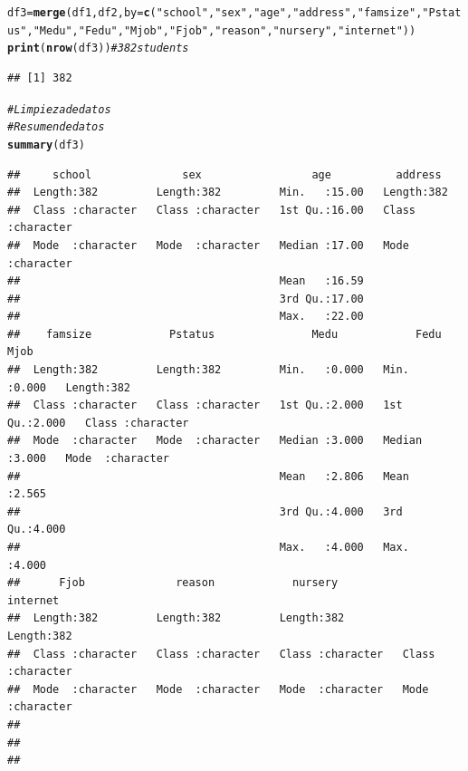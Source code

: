 \documentclass{article}\usepackage[]{graphicx}\usepackage[]{xcolor}
\makeatletter
\newcommand{\hlstr}[1]{\textcolor[rgb]{0.192,0.494,0.8}{#1}}%
\newcommand{\hlcom}[1]{\textcolor[rgb]{0.678,0.584,0.686}{\textit{#1}}}%
\newcommand{\hlstd}[1]{\textcolor[rgb]{0.345,0.345,0.345}{#1}}%
\newcommand{\hlkwb}[1]{\textcolor[rgb]{0.69,0.353,0.396}{#1}}%
\newcommand{\hlkwc}[1]{\textcolor[rgb]{0.333,0.667,0.333}{#1}}%
\newcommand{\hlkwd}[1]{\textcolor[rgb]{0.737,0.353,0.396}{\textbf{#1}}}%
\newenvironment{kframe}{%
 \def\at@end@of@kframe{}%
 \ifinner\ifhmode%
  \def\at@end@of@kframe{\end{minipage}}%
  \begin{minipage}{\columnwidth}%
 \fi\fi%
 \def\FrameCommand##1{\hskip\@totalleftmargin \hskip-\fboxsep
 \colorbox{shadecolor}{##1}\hskip-\fboxsep
     \hskip-\linewidth \hskip-\@totalleftmargin \hskip\columnwidth}%
 \MakeFramed {\advance\hsize-\width
   \@totalleftmargin\z@ \linewidth\hsize
   \@setminipage}}%
 {\par\unskip\endMakeFramed%
 \at@end@of@kframe}
\newenvironment{knitrout}{}{} %
\makeatother
\begin{document}
\begin{knitrout}
\begin{kframe}
\begin{alltt}
\hlstd{df3}\hlkwb{=}\hlkwd{merge}\hlstd{(df1,df2,}\hlkwc{by}\hlstd{=}\hlkwd{c}\hlstd{(}\hlstr{"school"}\hlstd{,}\hlstr{"sex"}\hlstd{,}\hlstr{"age"}\hlstd{,}\hlstr{"address"}\hlstd{,}\hlstr{"famsize"}\hlstd{,}\hlstr{"Pstatus"}\hlstd{,}\hlstr{"Medu"}\hlstd{,}\hlstr{"Fedu"}\hlstd{,}\hlstr{"Mjob"}\hlstd{,}\hlstr{"Fjob"}\hlstd{,}\hlstr{"reason"}\hlstd{,}\hlstr{"nursery"}\hlstd{,}\hlstr{"internet"}\hlstd{))}
\hlkwd{print}\hlstd{(}\hlkwd{nrow}\hlstd{(df3))} \hlcom{# 382 students}
\end{alltt}
\begin{verbatim}
## [1] 382
\end{verbatim}
\begin{alltt}
\hlcom{# Limpieza de datos}
\hlcom{# Resumen de datos}
\hlkwd{summary}\hlstd{(df3)}
\end{alltt}
\begin{verbatim}
##     school              sex                 age          address         
##  Length:382         Length:382         Min.   :15.00   Length:382        
##  Class :character   Class :character   1st Qu.:16.00   Class :character  
##  Mode  :character   Mode  :character   Median :17.00   Mode  :character  
##                                        Mean   :16.59                     
##                                        3rd Qu.:17.00                     
##                                        Max.   :22.00                     
##    famsize            Pstatus               Medu            Fedu           Mjob          
##  Length:382         Length:382         Min.   :0.000   Min.   :0.000   Length:382        
##  Class :character   Class :character   1st Qu.:2.000   1st Qu.:2.000   Class :character  
##  Mode  :character   Mode  :character   Median :3.000   Median :3.000   Mode  :character  
##                                        Mean   :2.806   Mean   :2.565                     
##                                        3rd Qu.:4.000   3rd Qu.:4.000                     
##                                        Max.   :4.000   Max.   :4.000                     
##      Fjob              reason            nursery            internet        
##  Length:382         Length:382         Length:382         Length:382        
##  Class :character   Class :character   Class :character   Class :character  
##  Mode  :character   Mode  :character   Mode  :character   Mode  :character  
##                                                                             
##                                                                             
##                                                                             

\end{verbatim}
\end{kframe}
\end{knitrout}
\end{document}
